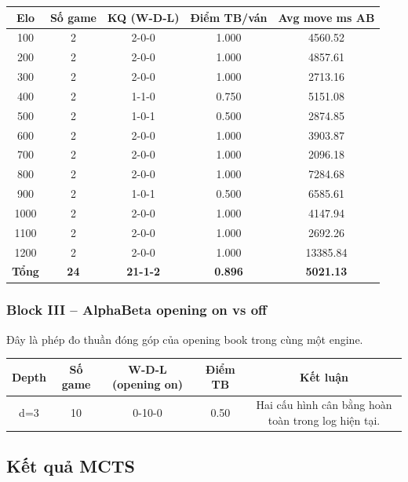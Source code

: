 \begin{center}
\small
\begin{tabular}{|c|c|c|c|c|}
\hline
\textbf{Elo} & \textbf{Số game} & \textbf{KQ (W-D-L)} & \textbf{Điểm TB/ván} & \textbf{Avg move ms AB} \\
\hline
100 & 2 & 2-0-0 & 1.000 & 4560.52 \\
\hline
200 & 2 & 2-0-0 & 1.000 & 4857.61 \\
\hline
300 & 2 & 2-0-0 & 1.000 & 2713.16 \\
\hline
400 & 2 & 1-1-0 & 0.750 & 5151.08 \\
\hline
500 & 2 & 1-0-1 & 0.500 & 2874.85 \\
\hline
600 & 2 & 2-0-0 & 1.000 & 3903.87 \\
\hline
700 & 2 & 2-0-0 & 1.000 & 2096.18 \\
\hline
800 & 2 & 2-0-0 & 1.000 & 7284.68 \\
\hline
900 & 2 & 1-0-1 & 0.500 & 6585.61 \\
\hline
1000 & 2 & 2-0-0 & 1.000 & 4147.94 \\
\hline
1100 & 2 & 2-0-0 & 1.000 & 2692.26 \\
\hline
1200 & 2 & 2-0-0 & 1.000 & 13385.84 \\
\hline
\textbf{Tổng} & \textbf{24} & \textbf{21-1-2} & \textbf{0.896} & \textbf{5021.13} \\
\hline
\end{tabular}
\end{center}

\subsubsection{Block III -- AlphaBeta opening on vs off}

Đây là phép đo thuần đóng góp của opening book trong cùng một engine.

\begin{center}
\begin{tabular}{|c|c|c|c|c|}
\hline
\textbf{Depth} & \textbf{Số game} & \textbf{W-D-L (opening on)} & \textbf{Điểm TB} & \textbf{Kết luận} \\
\hline
d=3 & 10 & 0-10-0 & 0.50 & Hai cấu hình cân bằng hoàn toàn trong log hiện tại. \\
\hline
\end{tabular}
\end{center}

\subsection{Kết quả MCTS}

